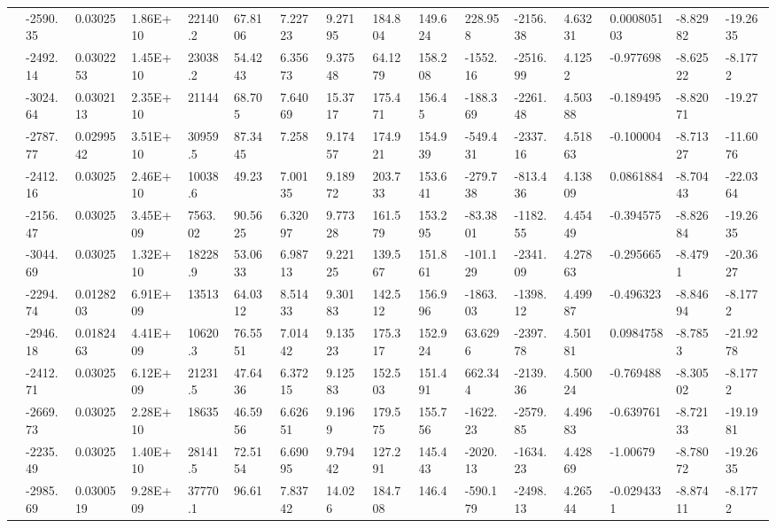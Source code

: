 \documentclass[paper=a4, fontsize=11pt]{scrartcl}
\numberwithin{equation}{section}
\numberwithin{figure}{section}
\numberwithin{table}{section}
\begin{document}
{{\begin{tabular}{l || l | l | l | l | l | l | l | l | l | l | l | l | l | l | l}
    & -2590.35 & 0.03025 & 1.86E+10 & 22140.2 & 67.8106 & 7.22723 & 9.27195 & 184.804 & 149.624 & 228.958 & -2156.38 & 4.63231 & 0.000805103 & -8.82982 & -19.2635 \\
    & -2492.14 & 0.0302253 & 1.45E+10 & 23038.2 & 54.4243 & 6.35673 & 9.37548 & 64.1279 & 158.208 & -1552.16 & -2516.99 & 4.1252 & -0.977698 & -8.62522 & -8.1772 \\
    & -3024.64 & 0.0302113 & 2.35E+10 & 21144 & 68.705 & 7.64069 & 15.3717 & 175.471 & 156.45 & -188.369 & -2261.48 & 4.50388 & -0.189495 & -8.82071 & -19.27 \\
    & -2787.77 & 0.0299542 & 3.51E+10 & 30959.5 & 87.3445 & 7.258 & 9.17457 & 174.921 & 154.939 & -549.431 & -2337.16 & 4.51863 & -0.100004 & -8.71327 & -11.6076 \\
    & -2412.16 & 0.03025 & 2.46E+10 & 10038.6 & 49.23 & 7.00135 & 9.18972 & 203.733 & 153.641 & -279.738 & -813.436 & 4.13809 & 0.0861884 & -8.70443 & -22.0364 \\
    & -2156.47 & 0.03025 & 3.45E+09 & 7563.02 & 90.5625 & 6.32097 & 9.77328 & 161.579 & 153.295 & -83.3801 & -1182.55 & 4.45449 & -0.394575 & -8.82684 & -19.2635 \\
    & -3044.69 & 0.03025 & 1.32E+10 & 18228.9 & 53.0633 & 6.98713 & 9.22125 & 139.567 & 151.861 & -101.129 & -2341.09 & 4.27863 & -0.295665 & -8.4791 & -20.3627 \\
    & -2294.74 & 0.0128203 & 6.91E+09 & 13513 & 64.0312 & 8.51433 & 9.30183 & 142.512 & 156.996 & -1863.03 & -1398.12 & 4.49987 & -0.496323 & -8.84694 & -8.1772 \\
    & -2946.18 & 0.0182463 & 4.41E+09 & 10620.3 & 76.5551 & 7.01442 & 9.13523 & 175.317 & 152.924 & 63.6296 & -2397.78 & 4.50181 & 0.0984758 & -8.7853 & -21.9278 \\
    & -2412.71 & 0.03025 & 6.12E+09 & 21231.5 & 47.6436 & 6.37215 & 9.12583 & 152.503 & 151.491 & 662.344 & -2139.36 & 4.50024 & -0.769488 & -8.30502 & -8.1772 \\
    & -2669.73 & 0.03025 & 2.28E+10 & 18635 & 46.5956 & 6.62651 & 9.1969 & 179.575 & 155.756 & -1622.23 & -2579.85 & 4.49683 & -0.639761 & -8.72133 & -19.1981 \\
    & -2235.49 & 0.03025 & 1.40E+10 & 28141.5 & 72.5154 & 6.69095 & 9.79442 & 127.291 & 145.443 & -2020.13 & -1634.23 & 4.42869 & -1.00679 & -8.78072 & -19.2635 \\
    & -2985.69 & 0.0300519 & 9.28E+09 & 37770.1 & 96.61 & 7.83742 & 14.026 & 184.708 & 146.4 & -590.179 & -2498.13 & 4.26544 & -0.0294331 & -8.87411 & -8.1772 \\

\end{tabular}}}
\end{document}
